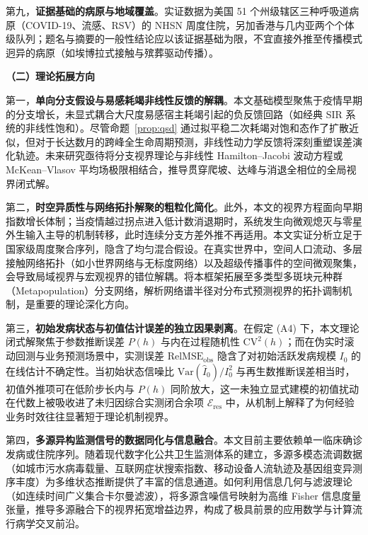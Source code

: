 \documentclass[11pt,a4paper]{article}
\theoremstyle{plain}
\theoremstyle{definition}
\begin{document}
{\sloppy 第九，\textbf{证据基础的病原与地域覆盖}。实证数据为美国 51 个州级辖区三种呼吸道病原（COVID-19、流感、RSV）的 NHSN 周度住院，另加香港与几内亚两个个体级队列；题名与摘要的一般性结论应以该证据基础为限，不宜直接外推至传播模式迥异的病原（如埃博拉式接触与殡葬驱动传播）。\par}

\noindent\textbf{（二）理论拓展方向}

第一，\textbf{单向分支假设与易感耗竭非线性反馈的解耦}。本文基础模型聚焦于疫情早期的分支增长，未显式耦合大尺度易感宿主耗竭引起的负反馈回路（如经典 SIR 系统的非线性饱和）。尽管命题~\ref{prop:qsd} 通过拟平稳二次耗竭对饱和态作了扩散近似，但对于长达数月的跨峰全生命周期预测，非线性动力学反馈将深刻重塑误差演化轨迹。未来研究亟待将分支视界理论与非线性 Hamilton--Jacobi 波动方程或 McKean--Vlasov 平均场极限相结合，推导贯穿爬坡、达峰与消退全相位的全局视界闭式解。

第二，\textbf{时空异质性与网络拓扑解聚的粗粒化简化}。此外，本文的视界方程面向早期指数增长体制；当疫情越过拐点进入低计数消退期时，系统发生向微观熄灭与零星外生输入主导的机制转移\citep{parag2026threshold}，此时连续分支方差外推不再适用。本文实证分析立足于国家级周度聚合序列，隐含了均匀混合假设。在真实世界中，空间人口流动、多层接触网络拓扑（如小世界网络与无标度网络）以及超级传播事件的空间微观聚集，会导致局域视界与宏观视界的错位解耦。将本框架拓展至多类型多斑块元种群（Metapopulation）分支网络，解析网络谱半径对分布式预测视界的拓扑调制机制，是重要的理论深化方向。

第三，\textbf{初始发病状态与初值估计误差的独立因果剥离}。在假定 (A4) 下，本文理论闭式解聚焦于参数推断误差 $P(h)$ 与内在过程随机性 $\text{CV}^2(h)$；而在伪实时滚动回测与业务预测场景中，实测误差 $\text{RelMSE}_{\text{obs}}$ 隐含了对初始活跃发病规模 $I_0$ 的在线估计不确定性。当初始状态信噪比 $\text{Var}(\hat{I}_0)/I_0^2$ 与再生数推断误差相当时，初值外推项可在低阶步长内与 $P(h)$ 同阶放大，这一未独立显式建模的初值扰动在代数上被吸收进了未归因综合实测闭合余项 $\mathcal{E}_{\text{res}}$ 中，从机制上解释了为何经验业务时效往往显著短于理论机制视界。

第四，\textbf{多源异构监测信号的数据同化与信息融合}。本文目前主要依赖单一临床确诊发病或住院序列。随着现代数字化公共卫生监测体系的建立，多源多模态流调数据（如城市污水病毒载量、互联网症状搜索指数、移动设备人流轨迹及基因组变异测序丰度）为多维状态推断提供了丰富的信息通道。如何利用信息几何与滤波理论（如连续时间广义集合卡尔曼滤波），将多源含噪信号映射为高维 Fisher 信息度量张量，推导多源融合下的视界拓宽增益边界，构成了极具前景的应用数学与计算流行病学交叉前沿。
\end{document}
